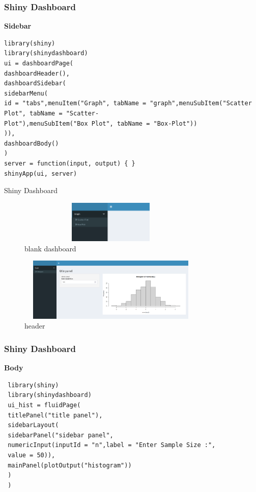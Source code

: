 \documentclass[aspectratio=169,serif,professionalfont]{beamer}
\begin{document}
\begin{frame}[fragile]
  \frametitle{Shiny Dashboard}
  \textbf{Sidebar}\\
\begin{verbatim}
library(shiny)
library(shinydashboard)
ui = dashboardPage(
dashboardHeader(),
dashboardSidebar(
sidebarMenu(
id = "tabs",menuItem("Graph", tabName = "graph",menuSubItem("Scatter Plot", tabName = "Scatter-                                                 Plot"),menuSubItem("Box Plot", tabName = "Box-Plot"))
)),
dashboardBody()
)
server = function(input, output) { }
shinyApp(ui, server) 
\end{verbatim}
\end{frame}

\begin{frame}{Shiny Dashboard}
    \begin{figure}[htbp]
    \centering
    \includegraphics[width=0.8\textwidth,height=2cm]{sidebar.png}
    \caption{blank dashboard}
    \label{fig:image_label7}
   \end{figure}
   \begin{figure}[htbp]
    \centering
    \includegraphics[width=0.8\textwidth,height=3cm]{body.png}
    \caption{header}
    \label{fig:image_label8}
   \end{figure}
\end{frame}

\begin{frame}[fragile]
  \frametitle{Shiny Dashboard}
  \textbf{Body}\\
\begin{verbatim}
 library(shiny)
 library(shinydashboard)
 ui_hist = fluidPage(
 titlePanel("title panel"),
 sidebarLayout(
 sidebarPanel("sidebar panel",
 numericInput(inputId = "n",label = "Enter Sample Size :",
 value = 50)),
 mainPanel(plotOutput("histogram"))
 )
 )
 
\end{verbatim}
\end{frame}
\end{document}
